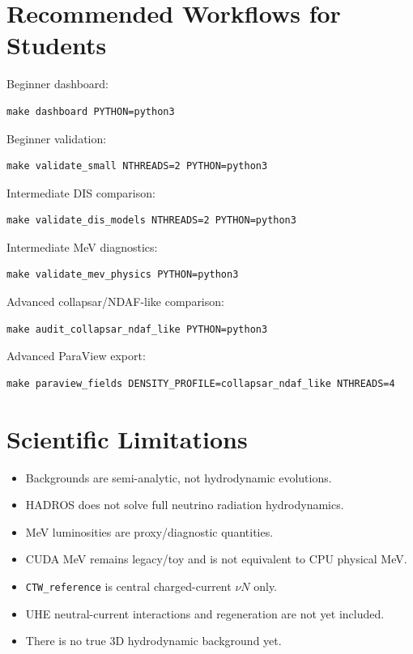 \documentclass[11pt,a4paper]{article}
\begin{document}
\section{Recommended Workflows for Students}

Beginner dashboard:
\begin{verbatim}
make dashboard PYTHON=python3
\end{verbatim}

Beginner validation:
\begin{verbatim}
make validate_small NTHREADS=2 PYTHON=python3
\end{verbatim}

Intermediate DIS comparison:
\begin{verbatim}
make validate_dis_models NTHREADS=2 PYTHON=python3
\end{verbatim}

Intermediate MeV diagnostics:
\begin{verbatim}
make validate_mev_physics PYTHON=python3
\end{verbatim}

Advanced collapsar/NDAF-like comparison:
\begin{verbatim}
make audit_collapsar_ndaf_like PYTHON=python3
\end{verbatim}

Advanced ParaView export:
\begin{verbatim}
make paraview_fields DENSITY_PROFILE=collapsar_ndaf_like NTHREADS=4
\end{verbatim}

\section{Scientific Limitations}

\begin{itemize}
\item Backgrounds are semi-analytic, not hydrodynamic evolutions.
\item HADROS does not solve full neutrino radiation hydrodynamics.
\item MeV luminosities are proxy/diagnostic quantities.
\item CUDA MeV remains legacy/toy and is not equivalent to CPU physical MeV.
\item \texttt{CTW\_reference} is central charged-current $\nu N$ only.
\item UHE neutral-current interactions and regeneration are not yet included.
\item There is no true 3D hydrodynamic background yet.
\end{itemize}
\end{document}

